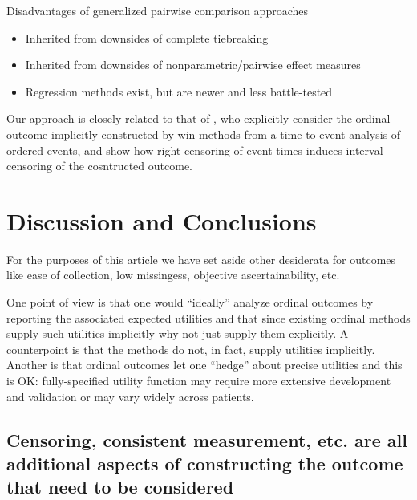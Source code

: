 \documentclass[
  11pt,
  fleqn
]{article}
\begin{document}
Disadvantages of generalized pairwise comparison approaches
\begin{itemize}
  \item Inherited from downsides of complete tiebreaking
  \item Inherited from downsides of nonparametric/pairwise effect measures
  \item Regression methods exist, but are newer and less battle-tested
\end{itemize}

Our approach is closely related to that of
\citet{follmannAnalysisOrderedComposite2020}, who explicitly consider the
ordinal outcome implicitly constructed by win methods from a time-to-event
analysis of ordered events, and show how right-censoring of event times induces
interval censoring of the cosntructed outcome.

\section{Discussion and Conclusions}

For the purposes of this article we have set aside other desiderata for
outcomes like ease of collection, low missingess, objective ascertainability,
etc.

One point of view is that one would ``ideally'' analyze ordinal outcomes by
reporting the associated expected utilities  and that since existing ordinal methods supply
such utilities implicitly why not just supply them explicitly. A counterpoint
is that the methods do not, in fact, supply utilities implicitly. Another is
that ordinal outcomes let one ``hedge'' about precise utilities and this is
OK: fully-specified utility function may require more extensive development and
validation or may vary widely across patients.

\subsection{Censoring, consistent measurement, etc. are all
additional aspects of constructing the outcome that need to be considered}

\newpage

\printbibliography
\end{document}
